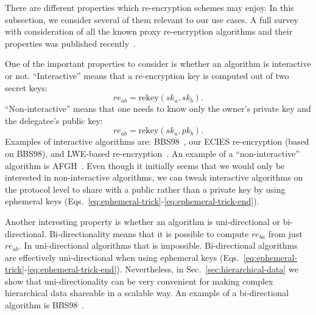 \documentclass[longbibliography,nofootinbib]{revtex4-1}
\begin{document}
There are different properties which re-encryption schemes may enjoy.
In this subsection, we consider several of them relevant to our use cases.
A full survey with consideration of all the known proxy re-encryption algorithms and their properties was published recently~\cite{nunez2017proxy}.

One of the important properties to consider is whether an algorithm is interactive or not.
``Interactive'' means that a re-encryption key is computed out of two secret keys:
\begin{equation}
    re_{ab} = \text{rekey}(sk_a, sk_b).
\end{equation}
``Non-interactive'' means that one needs to know only the owner's private key and the delegatee's public key:
\begin{equation}
    re_{ab} = \text{rekey}(sk_a, pk_b).
\end{equation}
Examples of interactive algorithms are: BBS98~\cite{BBS98}, our ECIES re-encryption (based on BBS98), and LWE-based re-encryption~\cite{lwe-reencryption}.
An example of a ``non-interactive'' algorithm is AFGH~\cite{AFGH}.
Even though it initially seems that we would only be interested in non-interactive algorithms,
we can tweak interactive algorithms on the protocol level to share with a public rather than a private key by
using ephemeral keys (Eqs.~\ref{eq:ephemeral-trick}-\ref{eq:ephemeral-trick-end}).

Another interesting property is whether an algorithm is uni-directional or bi-directional.
Bi-directionality means that it is possible to compute $re_{ba}$ from just $re_{ab}$.
In uni-directional algorithms that is impossible.
Bi-directional algorithms are effectively uni-directional when using ephemeral keys
(Eqs.~\ref{eq:ephemeral-trick}-\ref{eq:ephemeral-trick-end}).
Nevertheless, in Sec.~\ref{sec:hierarchical-data} we show that uni-directionality can be very convenient for making complex hierarchical data shareable in a
scalable way.
An example of a bi-directional algorithm is BBS98~\cite{BBS98}.
\end{document}
